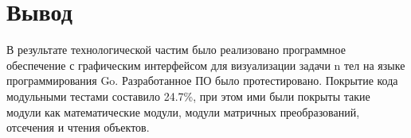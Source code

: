 \section*{Вывод}

В результате технологической частим было реализовано программное обеспечение с графическим интерфейсом для визуализации задачи n тел на языке программирования Go. Разработанное ПО было протестировано. Покрытие кода модульными тестами составило 24.7\%, при этом ими были покрыты такие модули как математические модули, модули матричных преобразований, отсечения и чтения объектов.


\clearpage
